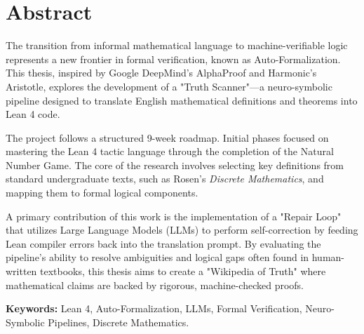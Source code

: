 \chapter*{Abstract}

The transition from informal mathematical language to machine-verifiable logic represents a new frontier in formal verification, known as Auto-Formalization. This thesis, inspired by Google DeepMind's AlphaProof and Harmonic's Aristotle, explores the development of a "Truth Scanner"—a neuro-symbolic pipeline designed to translate English mathematical definitions and theorems into Lean 4 code. 

The project follows a structured 9-week roadmap. Initial phases focused on mastering the Lean 4 tactic language through the completion of the Natural Number Game. The core of the research involves selecting key definitions from standard undergraduate texts, such as Rosen’s \textit{Discrete Mathematics}, and mapping them to formal logical components. 

A primary contribution of this work is the implementation of a "Repair Loop" that utilizes Large Language Models (LLMs) to perform self-correction by feeding Lean compiler errors back into the translation prompt. By evaluating the pipeline's ability to resolve ambiguities and logical gaps often found in human-written textbooks, this thesis aims to create a "Wikipedia of Truth" where mathematical claims are backed by rigorous, machine-checked proofs.

\textbf{Keywords:} Lean 4, Auto-Formalization, LLMs, Formal Verification, Neuro-Symbolic Pipelines, Discrete Mathematics.